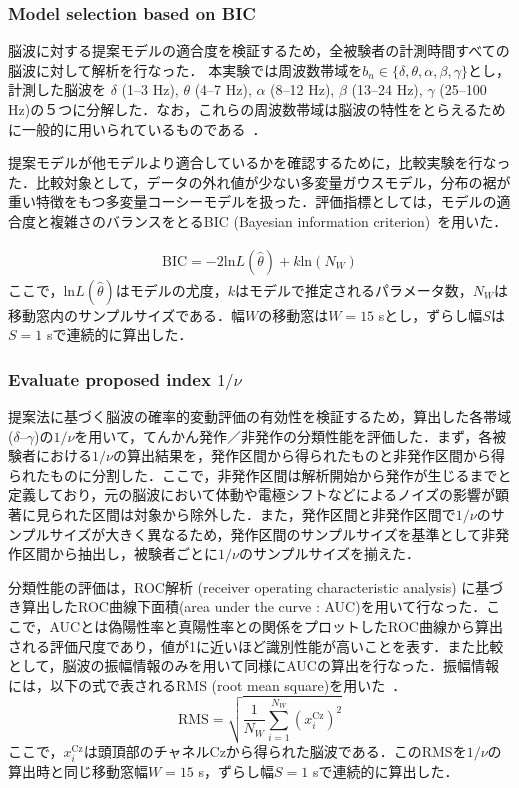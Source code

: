 \documentclass[journal]{IEEEtran}
\begin{document}
\subsubsection{Model selection based on BIC}
脳波に対する提案モデルの適合度を検証するため，全被験者の計測時間すべての脳波に対して解析を行なった．
本実験では周波数帯域を$b_n \in\{\delta, \theta, \alpha,\beta, \gamma\}$とし，計測した脳波を
$\delta$ (1--3 Hz), $\theta$ (4--7 Hz), $\alpha$ (8--12 Hz), $\beta$ (13--24 Hz), $\gamma$ (25--100 Hz)の５つに分解した．なお，これらの周波数帯域は脳波の特性をとらえるために一般的に用いられているものである~\cite{ep1994}．

提案モデルが他モデルより適合しているかを確認するために，比較実験を行なった．比較対象として，データの外れ値が少ない多変量ガウスモデル，分布の裾が重い特徴をもつ多変量コーシーモデルを扱った．評価指標としては，モデルの適合度と複雑さのバランスをとるBIC (Bayesian information criterion)~\cite{Schwarz1978}を用いた．

\begin{eqnarray}%
	\mathrm{BIC} = -2 \mathrm{ln}L(\hat{\theta}) + k \mathrm{ln}(N_W)
\end{eqnarray}
ここで，$\mathrm{ln}L(\hat{\theta})$はモデルの尤度，$k$はモデルで推定されるパラメータ数，$N_W$は移動窓内のサンプルサイズである．幅$W$の移動窓は$W = 15$ sとし，ずらし幅$S$は$S = 1$ sで連続的に算出した．

\subsubsection{Evaluate proposed index $1/\nu$}
提案法に基づく脳波の確率的変動評価の有効性を検証するため，算出した各帯域 ($\delta$--$\gamma$)の$1/\nu$を用いて，てんかん発作／非発作の分類性能を評価した．まず，各被験者における$1/\nu$の算出結果を，発作区間から得られたものと非発作区間から得られたものに分割した．ここで，非発作区間は解析開始から発作が生じるまでと定義しており，元の脳波において体動や電極シフトなどによるノイズの影響が顕著に見られた区間は対象から除外した．また，発作区間と非発作区間で$1/\nu$のサンプルサイズが大きく異なるため，発作区間のサンプルサイズを基準として非発作区間から抽出し，被験者ごとに$1/\nu$のサンプルサイズを揃えた．

分類性能の評価は，ROC解析 (receiver operating characteristic analysis) に基づき算出したROC曲線下面積(area under the curve : AUC)を用いて行なった．ここで，AUCとは偽陽性率と真陽性率との関係をプロットしたROC曲線から算出される評価尺度であり，値が1に近いほど識別性能が高いことを表す．また比較として，脳波の振幅情報のみを用いて同様にAUCの算出を行なった．振幅情報には，以下の式で表されるRMS (root mean square)を用いた~\cite{Hamedi2014}．
\begin{equation}%
		\mathrm{RMS} = \sqrt{\frac{1}{N_W} \sum_{i=1}^{N_W} (x_i^\mathrm{Cz})^2}
\end{equation}
ここで，$x_i^\mathrm{Cz}$は頭頂部のチャネルCzから得られた脳波である．このRMSを$1/\nu$の算出時と同じ移動窓幅$W = 15$ s，ずらし幅$S = 1$ sで連続的に算出した．
\end{document}
